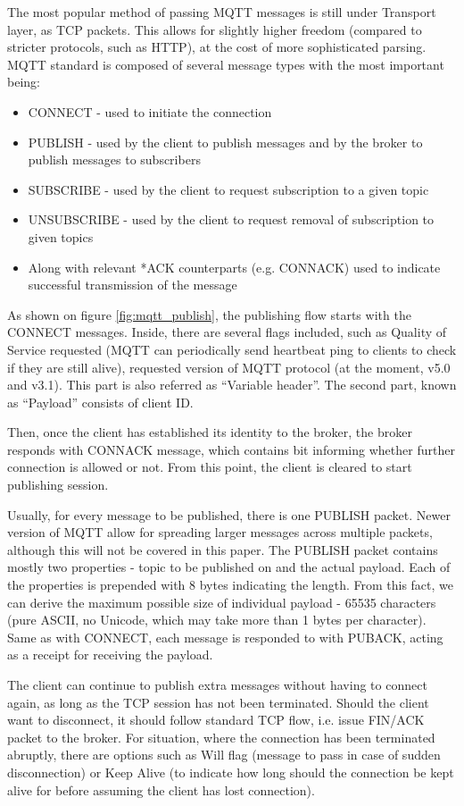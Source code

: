 The most popular method of passing MQTT messages is still under Transport layer, as TCP packets. This allows for slightly higher freedom (compared to stricter protocols, such as HTTP), at the cost of more sophisticated parsing. MQTT standard is composed of several message types with the most important being:
\begin{itemize}
  \item CONNECT - used to initiate the connection
  \item PUBLISH - used by the client to publish messages and by the broker to publish messages to subscribers
  \item SUBSCRIBE - used by the client to request subscription to a given topic
  \item UNSUBSCRIBE - used by the client to request removal of subscription to given topics
  \item Along with relevant *ACK counterparts (e.g. CONNACK) used to indicate successful transmission of the message
\end{itemize}
As shown on figure \ref{fig:mqtt_publish}, the publishing flow starts with the CONNECT messages. Inside, there are several flags included, such as Quality of Service requested (MQTT can periodically send heartbeat ping to clients to check if they are still alive), requested version of MQTT protocol (at the moment, v5.0 and v3.1). This part is also referred as ``Variable header''. The second part, known as ``Payload'' consists of client ID.

Then, once the client has established its identity to the broker, the broker responds with CONNACK message, which contains bit informing whether further connection is allowed or not. From this point, the client is cleared to start publishing session.

Usually, for every message to be published, there is one PUBLISH packet. Newer version of MQTT allow for spreading larger messages across multiple packets, although this will not be covered in this paper. The PUBLISH packet contains mostly two properties - topic to be published on and the actual payload. Each of the properties is prepended with 8 bytes indicating the length. From this fact, we can derive the maximum possible size of individual payload - 65535 characters (pure ASCII, no Unicode, which may take more than 1 bytes per character). Same as with CONNECT, each message is responded to with PUBACK, acting as a receipt for receiving the payload.

The client can continue to publish extra messages without having to connect again, as long as the TCP session has not been terminated. Should the client want to disconnect, it should follow standard TCP flow, i.e. issue FIN/ACK packet to the broker. For situation, where the connection has been terminated abruptly, there are options such as Will flag (message to pass in case of sudden disconnection) or Keep Alive (to indicate how long should the connection be kept alive for before assuming the client has lost connection).

